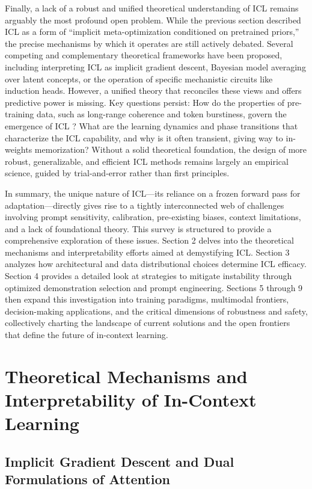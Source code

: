 \documentclass[11pt]{article}
\begin{document}
Finally, a lack of a robust and unified theoretical understanding of ICL remains arguably the most profound open problem. While the previous section described ICL as a form of ``implicit meta-optimization conditioned on pretrained priors,'' the precise mechanisms by which it operates are still actively debated. Several competing and complementary theoretical frameworks have been proposed, including interpreting ICL as implicit gradient descent, Bayesian model averaging over latent concepts, or the operation of specific mechanistic circuits like induction heads. However, a unified theory that reconciles these views and offers predictive power is missing. Key questions persist: How do the properties of pre-training data, such as long-range coherence and token burstiness, govern the emergence of ICL \cite{ref41}? What are the learning dynamics and phase transitions that characterize the ICL capability, and why is it often transient, giving way to in-weights memorization? Without a solid theoretical foundation, the design of more robust, generalizable, and efficient ICL methods remains largely an empirical science, guided by trial-and-error rather than first principles.

In summary, the unique nature of ICL---its reliance on a frozen forward pass for adaptation---directly gives rise to a tightly interconnected web of challenges involving prompt sensitivity, calibration, pre-existing biases, context limitations, and a lack of foundational theory. This survey is structured to provide a comprehensive exploration of these issues. Section 2 delves into the theoretical mechanisms and interpretability efforts aimed at demystifying ICL. Section 3 analyzes how architectural and data distributional choices determine ICL efficacy. Section 4 provides a detailed look at strategies to mitigate instability through optimized demonstration selection and prompt engineering. Sections 5 through 9 then expand this investigation into training paradigms, multimodal frontiers, decision-making applications, and the critical dimensions of robustness and safety, collectively charting the landscape of current solutions and the open frontiers that define the future of in-context learning.

\section{Theoretical Mechanisms and Interpretability of In-Context Learning}

\subsection{Implicit Gradient Descent and Dual Formulations of Attention}
\end{document}
